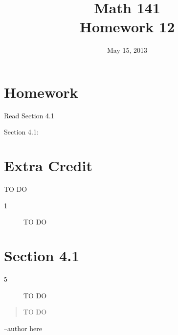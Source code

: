 \documentclass{exam}
\date{May 15, 2013}
\author{}
\title{Math 141 \\ Homework 12}
\begin{document}
\maketitle


\section{Homework}

\begin{itemize*}
  \item Read Section 4.1 
  \item Section 4.1: 
\end{itemize*}

\section{Extra Credit}
  TO DO 

\ifprintanswers
  \pagebreak

  \begin{description}
    \item[1] TO DO

  \end{description}

  \pagebreak

  \section{Section 4.1}

  \begin{description}

    \item[5] TO DO

  \end{description}

\else
  \vspace{6 cm}
  \begin{quote}
    \begin{em}
      TO DO
    \end{em}
  \end{quote}

  \hspace{1 cm} --author here


\fi
\end{document}
